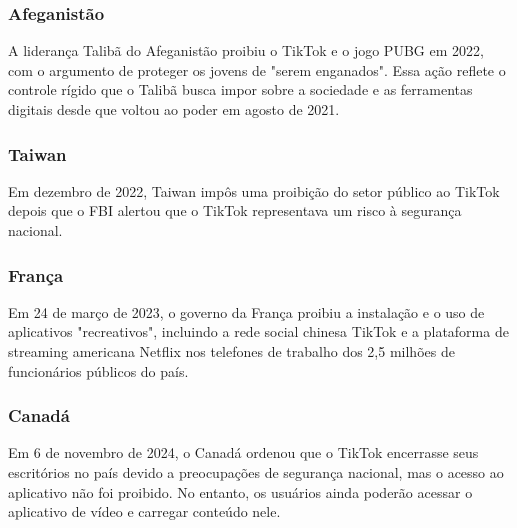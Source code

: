 \subsubsection{Afeganistão}

A liderança Talibã do Afeganistão proibiu o TikTok e o jogo PUBG em 2022, com o argumento de proteger os jovens de "serem enganados". Essa ação reflete o controle rígido que o Talibã busca impor sobre a sociedade e as ferramentas digitais desde que voltou ao poder em agosto de 2021.


\subsubsection{Taiwan}

Em dezembro de 2022, Taiwan impôs uma proibição do setor público ao TikTok depois que o FBI alertou que o TikTok representava um risco à segurança nacional.


\subsubsection{França}

Em 24 de março de 2023, o governo da França proibiu a instalação e o uso de aplicativos "recreativos", incluindo a rede social chinesa TikTok e a plataforma de streaming americana Netflix nos telefones de trabalho dos 2,5 milhões de funcionários públicos do país.


\subsubsection{Canadá}
Em 6 de novembro de 2024, o Canadá ordenou que o TikTok encerrasse seus escritórios no país devido a preocupações de segurança nacional, mas o acesso ao aplicativo não foi proibido. No entanto, os usuários ainda poderão acessar o aplicativo de vídeo e carregar conteúdo nele.
